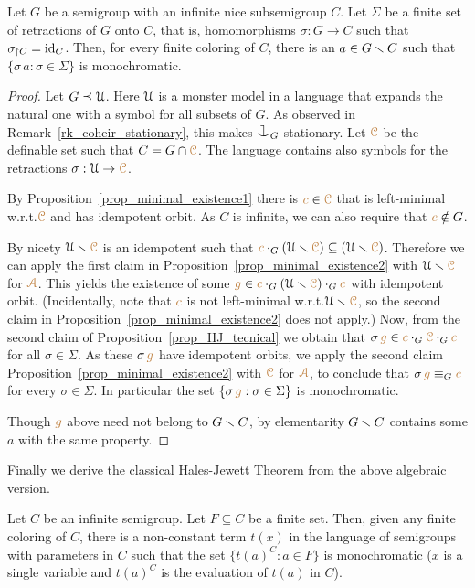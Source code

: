 \begin{void}\label{thm_abstract_HJ}
Let $G$ be a semigroup with an infinite nice subsemigroup $C$.
Let $\Sigma$ be a finite set of retractions of $G$ onto $C$, that is, 
homomorphisms $\sigma:G\to C$ such that $\sigma_{\restriction C}={\rm id}_C$.
Then, for every finite coloring of $C$,
there is an $a\in G\smallsetminus C$ such that $\{\sigma\,a:\sigma\in\Sigma\}$ is monochromatic.
\end{void}

\begin{proof}
Let $G\preceq\EuScript U$.
Here $\EuScript U$ is a monster model in a language that expands the natural one with a symbol for all subsets of $G$.
As observed in Remark~\ref{rk_coheir_stationary}, 
this makes $\cnonfork_G$ stationary.
Let ${\color{brown}\EuScript C}$ be the definable set such that $C=G\cap{\color{brown}\EuScript C}$.
The language contains also symbols for 
the retractions $\sigma:\EuScript U\to{\color{brown}\EuScript C}$.

By Proposition~\ref{prop_minimal_existence1} there is ${\color{brown} c}\in{\color{brown}\EuScript C}$ that is left-minimal w.r.t.\@ ${\color{brown}\EuScript C}$ and has idempotent orbit.
As $C$ is infinite, we can also require that ${\color{brown} c}\notin G$.

By nicety $\EuScript U\smallsetminus{\color{brown}\EuScript C}$ is an idempotent such that ${\color{brown} c}\cdot_G(\EuScript U\smallsetminus{\color{brown}\EuScript C})\subseteq(\EuScript U\smallsetminus{\color{brown}\EuScript C})$.
Therefore we can apply the first claim in Proposition~\ref{prop_minimal_existence2} with $\EuScript U\smallsetminus{\color{brown}\EuScript C}$ for ${\color{brown}\EuScript A}$.
This yields the existence of some  ${\color{brown} g}\in{\color{brown}c}\cdot_G(\EuScript U\smallsetminus{\color{brown}\EuScript C})\cdot_G{\color{brown} c}$ with idempotent orbit.
%
(Incidentally, note that ${\color{brown} c}$ is not left-minimal w.r.t.\@ $\EuScript U\smallsetminus{\color{brown}\EuScript C}$, so the second claim in Proposition~\ref{prop_minimal_existence2} does not apply.)
%
Now, from the second claim of Proposition~\ref{prop_HJ_tecnical} we obtain that 
$\sigma\,{\color{brown} g}\in{\color{brown}c}\cdot_G{\color{brown}\EuScript C}\cdot_G{\color{brown} c}$ 
for all $\sigma\in\Sigma$.
%
As these $\sigma\,{\color{brown} g}$ have idempotent orbits, we apply the second claim Proposition~\ref{prop_minimal_existence2} with ${\color{brown}\EuScript C}$ for ${\color{brown}\EuScript A}$, to conclude that 
$\sigma\,{\color{brown} g}\equiv_G{\color{brown} c}$ for every $\sigma\in\Sigma$.
%
In particular the set $\{\sigma\,{\color{brown} g}:\sigma\in\Sigma\}$ is monochromatic.

Though ${\color{brown} g}$ above need not belong to $G\smallsetminus C$, by elementarity $G\smallsetminus C$ contains some $a$ with the same property.
\end{proof}

Finally we derive the classical Hales-Jewett Theorem from the above algebraic version.

\begin{void}\label{thm_HalesJewett}
  Let $C$ be an infinite semigroup.
  Let $F\subseteq C$ be a finite set.
  Then, given any finite coloring of $C$, there is a non-constant term $t(x)$ in the language of semigroups with parameters in $C$ such that the set $\{ t(a)^C: a\in F\}$ is monochromatic ($x$ is a single variable and $t(a)^C$ is the evaluation of $t(a)$ in $C$).
\end{void}

